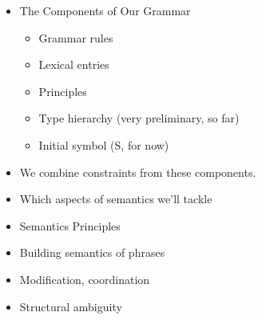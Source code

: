 \documentclass[a4paper,landscape,headrule,footrule]{foils}
\begin{document}
\begin{itemize}
\item The Components of Our Grammar
\begin{itemize}
\item Grammar rules
\item Lexical entries
\item Principles
\item Type hierarchy (very preliminary, so far)
\item Initial symbol (S, for now) \\[2ex]
  \begin{small}
\end{small}   

\end{itemize}
\item We combine constraints from these components.
\end{itemize}


\begin{itemize}
\item Which aspects of semantics we’ll tackle
\item Semantics Principles
\item Building semantics of phrases
\item Modification, coordination
\item Structural ambiguity
\end{itemize}


\end{document}
